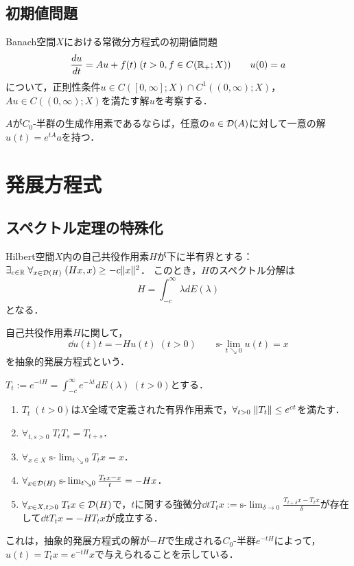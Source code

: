 \documentclass[uplatex,dvipdfmx]{jsreport}
\begin{document}
\subsection{初期値問題}

\begin{problem}
    Banach空間$X$における常微分方程式の初期値問題
    \[\frac{d u}{d t}=Au+f(t)\;(t>0,f\in C(\mathbb{R}_+;X))\qquad u(0)=a\]
    について，正則性条件$u\in C([0,\infty];X)\cap C^1((0,\infty);X)$，$Au\in C((0,\infty);X)$を満たす解$u$を考察する．
\end{problem}

\begin{proposition}
    $A$が$C_0$-半群の生成作用素であるならば，任意の$a\in\mathcal{D}(A)$に対して一意の解$u(t)=e^{tA}a$を持つ．
\end{proposition}

\section{発展方程式}

\subsection{スペクトル定理の特殊化}

\begin{discussion}
    Hilbert空間$X$内の自己共役作用素$H$が下に半有界とする：$\exists_{c\in\mathbb{R}}\;\forall_{x\in\mathcal{D}(H)}\;(Hx,x)\ge-c\|x\|^2$．
    このとき，$H$のスペクトル分解は
    \[H=\int^\infty_{-c}\lambda dE(\lambda)\]
    となる．
\end{discussion}

\begin{problem}[抽象的発展方程式]
    自己共役作用素$H$に関して，
    \[\dd{u(t)}{t}=-Hu(t)\;(t>0)\qquad\text{s-}\lim_{t\searrow0}u(t)=x\]
    を抽象的発展方程式という．
\end{problem}

\begin{theorem}
    $T_t:=e^{-tH}=\int^\infty_{-c}e^{-\lambda t}dE(\lambda)\;(t>0)$とする．
    \begin{enumerate}
        \item $T_t\;(t>0)$は$X$全域で定義された有界作用素で，$\forall_{t>0}\;\|T_t\|\le e^{ct}$を満たす．
        \item $\forall_{t,s>0}\;T_tT_s=T_{t+s}$．
        \item $\forall_{x\in X}\;\text{s-}\lim_{t\searrow0}T_tx=x$．
        \item $\forall_{x\in\mathcal{D}(H)}\;\text{s-}\lim_{t\searrow0}\frac{T_tx-x}{t}=-Hx$．
        \item $\forall_{x\in X,t>0}\;T_tx\in\mathcal{D}(H)$で，$t$に関する強微分$\dd{}{t}T_tx:=\text{s-}\lim_{\delta\to0}\frac{T_{t+\delta}x-T_tx}{\delta}$が存在して$\dd{}{t}T_tx=-HT_tx$が成立する．
    \end{enumerate}
\end{theorem}
\begin{remarks}
    これは，抽象的発展方程式の解が$-H$で生成される$C_0$-半群$e^{-tH}$によって，
    $u(t)=T_tx=e^{-tH}x$で与えられることを示している．
\end{remarks}
\end{document}
